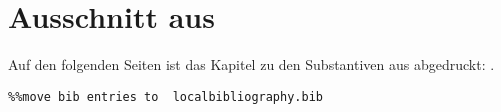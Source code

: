 \noindent
\chapter{Ausschnitt aus \citet{Stucki1917}}\label{appendix6}

\noindent
Auf den folgenden Seiten ist das Kapitel zu den Substantiven aus \citet{Stucki1917} abgedruckt: \citet[255–273]{Stucki1917}.






\begin{verbatim}%%move bib entries to  localbibliography.bib
\end{verbatim}